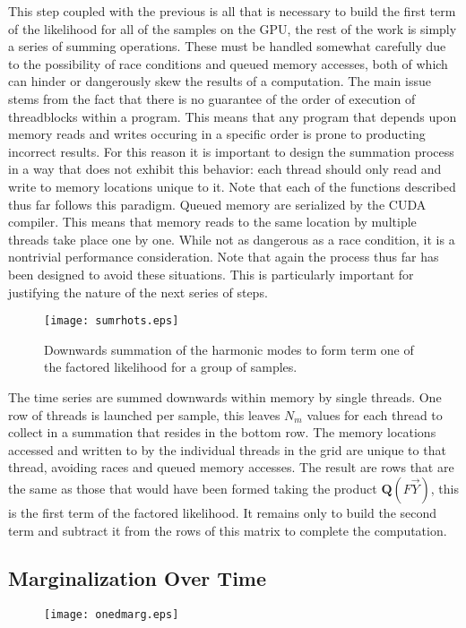 \documentclass[paper=a4, fontsize=11pt]{scrartcl} %
\numberwithin{equation}{section} %
\numberwithin{figure}{section} %
\numberwithin{table}{section} %
\begin{document}
This step coupled with the previous is all that is necessary to build the first term of the likelihood for all of the samples on the GPU, the rest of the work is simply a series of summing operations. These must be handled somewhat carefully due to the possibility of race conditions and queued memory accesses, both of which can hinder or dangerously skew the results of a computation. 
The main issue stems from the fact that there is no guarantee of the order of execution of threadblocks within a program. This means that any program that depends upon memory reads and writes occuring in a specific order is prone to producting incorrect results. For this reason it is important to design the summation process in a way that does not exhibit this behavior: each thread should only read and write to memory locations unique to it. Note that each of the functions described thus far follows this paradigm.
Queued memory are serialized by the CUDA compiler. This means that memory reads to the same location by multiple threads take place one by one. While not as dangerous as a race condition, it is a nontrivial performance consideration. Note that again the process thus far has been designed to avoid these situations. This is particularly important for justifying the nature of the next series of steps.   

\clearpage

\begin{wrapfigure}{l}{0.6\textwidth}
\vspace{-0.78cm}
\begin{center}
\texttt{[image: sumrhots.eps]}
\caption{Downwards summation of the harmonic modes to form term one of the factored likelihood for a group of samples.}
\end{center}
\end{wrapfigure}

The time series are summed downwards within memory by single threads. One row of threads is launched per sample, this leaves $N_m$ values for each thread to collect in a summation that resides in the bottom row. The memory locations accessed and written to by the individual threads in the grid are unique to that thread, avoiding races and queued memory accesses. The result are rows that are the same as those that would have been formed taking the product $\mathbf{Q}(F\vec{Y})$, this is the first term of the factored likelihood. It remains only to build the second term and subtract it from the rows of this matrix to complete the computation.  

\subsection{Marginalization Over Time}

\begin{wrapfigure}{l}{0.6\textwidth}
\begin{center}
\texttt{[image: onedmarg.eps]}
\end{center}
\end{wrapfigure}

\end{document}
